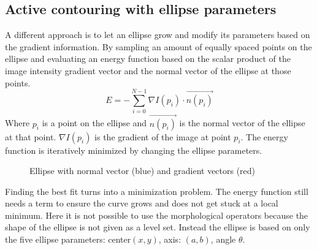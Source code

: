 \newpage
\subsection{Active contouring with ellipse parameters}
A different approach is to let an ellipse grow and modify its parameters based on the gradient information. By sampling an amount of equally spaced points on the ellipse and evaluating an energy function based on the scalar product of the image intensity gradient vector  and the normal vector of the ellipse at those points. 
\begin{equation}
    E = -\sum_{i=0}^{N-1} \nabla I(p_i) \cdot \vec{n(p_i)}
\end{equation} 
Where $p_i$ is a point on the ellipse and $\vec{n(p_i)}$ is the normal vector of the ellipse at that point. $\nabla I(p_i)$ is the gradient of the image at point $p_i$. The energy function is iteratively minimized by changing the ellipse parameters.
\begin{figure}[h]
    \centering
    \label{fig:normalgradientellipse}
    \caption{Ellipse with normal vector (blue) and gradient vectors (red)}
    
    \end{figure}
Finding the best fit turns into a minimization problem. The energy function still needs a term to ensure the curve grows and does not get stuck at a local minimum. Here it is not possible to use the morphological operators because the shape of the ellipse is not given as a level set. Instead the ellipse is based on only the five ellipse parameters: center$(x,y)$, axis: $(a,b)$, angle $\theta$. 

